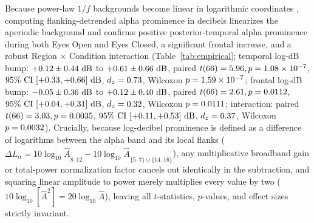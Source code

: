 \documentclass[11pt,letterpaper]{article}
\begin{document}
Because power-law $1/f$ backgrounds become linear in logarithmic coordinates \citep{donoghue2020parameterizing,keil2022recommendations}, computing flanking-detrended alpha prominence in decibels linearizes the aperiodic background and confirms positive posterior-temporal alpha prominence during both Eyes Open and Eyes Closed, a significant frontal increase, and a robust Region $\times$ Condition interaction (Table~\ref{tab:empirical}; temporal log-dB bump: $+0.12 \pm 0.44\text{ dB}$ to $+0.61 \pm 0.66\text{ dB}$, paired $t(66) = 5.96, p = 1.08\times 10^{-7}$, $95\%\text{ CI } [+0.33, +0.66]\text{ dB}$, $d_z = 0.73$, Wilcoxon $p = 1.59\times 10^{-7}$; frontal log-dB bump: $-0.05 \pm 0.36\text{ dB}$ to $+0.12 \pm 0.40\text{ dB}$, paired $t(66) = 2.61, p = 0.0112$, $95\%\text{ CI } [+0.04, +0.31]\text{ dB}$, $d_z = 0.32$, Wilcoxon $p = 0.0111$; interaction: paired $t(66) = 3.03, p = 0.0035$, $95\%\text{ CI } [+0.11, +0.53]\text{ dB}$, $d_z = 0.37$, Wilcoxon $p = 0.0032$). Crucially, because log-decibel prominence is defined as a difference of logarithms between the alpha band and its local flanks ($\Delta L_{\alpha} = 10\overline{\log_{10} \hat{A}}_{8\text{--}12} - 10\overline{\log_{10} \hat{A}}_{\{5\text{--}7\}\cup\{14\text{--}16\}}$), any multiplicative broadband gain or total-power normalization factor cancels out identically in the subtraction, and squaring linear amplitude to power merely multiplies every value by two ($10\log_{10}[\hat{A}^2] = 20\log_{10}\hat{A}$), leaving all $t$-statistics, $p$-values, and effect sizes strictly invariant.
\end{document}

